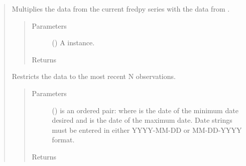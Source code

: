\documentclass[letterpaper,10pt,openany,oneside,english]{sphinxmanual}
\begin{document}
\begin{fulllineitems}
\begin{quote}
\begin{fulllineitems}
\label{\detokenize{series_class:fredpy.series.times}}
Multiplies the data from the current fredpy series with the data from .
\begin{quote}\begin{description}
\item[{Parameters}] \leavevmode
{} ({\hyperref[\detokenize{series_class:fredpy.series}]{}}) \textendash{} A {\hyperref[\detokenize{series_class:fredpy.series}]{}} instance.

\item[{Returns}] \leavevmode
{\hyperref[\detokenize{series_class:fredpy.series}]{}}

\end{description}\end{quote}

\end{fulllineitems}


\begin{fulllineitems}
\label{\detokenize{series_class:fredpy.series.window}}
Restricts the data to the most recent N observations.
\begin{quote}\begin{description}
\item[{Parameters}] \leavevmode
{} () \textendash{} is an ordered pair:  where  is the date of the minimum date desired and  is the date of the maximum date. Date strings must be entered in either YYYY-MM-DD or MM-DD-YYYY format.

\item[{Returns}] \leavevmode
{\hyperref[\detokenize{series_class:fredpy.series}]{}}

\end{description}\end{quote}

\end{fulllineitems}

\end{quote}

\end{fulllineitems}
\end{document}

